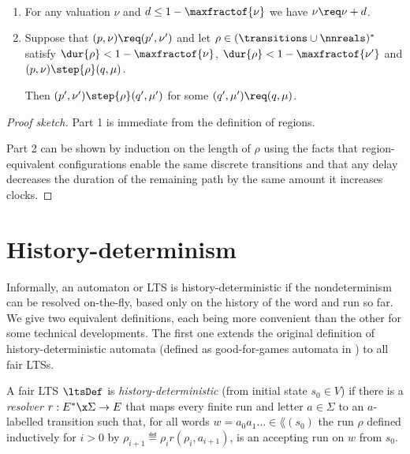 \begin{proposition}\
    \label{lem:paths}
\begin{enumerate}
    \item 
    \label{lem:paths-short-delay}
For any valuation $\nu$ and $d\le 1- \maxfractof{\nu}$
we have $\nu\req\nu+d$.


    \item 
    \label{lem:paths-short-path}
    Suppose that
    $(p,\nu)\req(p',\nu')$
    and let
    $\rho\in (\transitions\cup\nnreals)^*$
    satisfy
    $\dur{\rho} < 1-\maxfractof{\nu}$,
    $\dur{\rho} < 1-\maxfractof{\nu'}$
    and
    $(p,\nu)\step{\rho}(q,\mu)$.
    
    Then 
    $(p',\nu')\step{\rho}(q',\mu')$
    for some 
    $(q',\mu')\req(q,\mu)$.
\end{enumerate}
\end{proposition}
\begin{proof}[Proof sketch]
    Part 1 is immediate from the definition of regions.


    Part 2 can be shown by induction on the length of $\rho$
    using the facts that region-equivalent configurations enable the same discrete transitions
    and that
    any delay decreases the duration of the remaining path by the same amount it increases clocks.
    \qedhere


\end{proof}
	
	\section{History-determinism}
	\label{sec:gfg}
Informally, an  automaton or LTS is history-deterministic if the nondeterminism can be resolved on-the-fly, based only on the history of the word and run so far. We give two equivalent definitions, each being more convenient than the other for some technical developments. 
The first one extends the original definition of history-deterministic  automata (defined as good-for-games automata in \cite{HP06}) to all fair LTSs. 

\begin{definition}
    A fair LTS $\ltsDef$ is \emph{history-deterministic} (from initial state $s_0\in V$) if there is a \emph{resolver} $r:E^*\x\Sigma\to E$ that maps every finite run and letter $a\in \Sigma$ to an $a$-labelled transition
    such that, for all words $w=a_0a_1\dots \in \lang(s_0)$
    the run $\rho$ defined inductively for $i>0$ by $\rho_{i+1} \eqdef \rho_ir(\rho_i, a_{i+1})$,
    is an accepting run on $w$ from $s_0$.
\end{definition}

